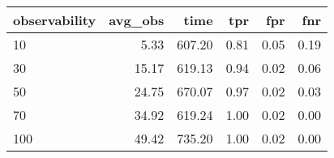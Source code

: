 \begin{tabular}{lrrrrr}
\toprule
observability & avg_obs & time & tpr & fpr & fnr \\
\midrule
10 & 5.33 & 607.20 & 0.81 & 0.05 & 0.19 \\
30 & 15.17 & 619.13 & 0.94 & 0.02 & 0.06 \\
50 & 24.75 & 670.07 & 0.97 & 0.02 & 0.03 \\
70 & 34.92 & 619.24 & 1.00 & 0.02 & 0.00 \\
100 & 49.42 & 735.20 & 1.00 & 0.02 & 0.00 \\
\bottomrule
\end{tabular}
